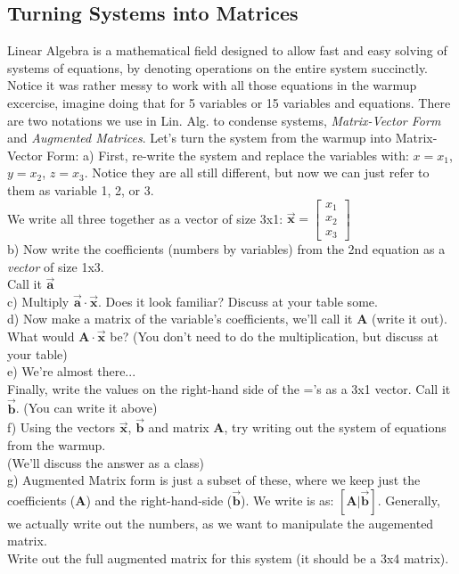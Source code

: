 \documentclass{article}
\begin{document}
\begin{flushleft}
\section{Turning Systems into Matrices}
Linear Algebra is a mathematical field designed to allow fast and easy solving of systems of equations, by denoting operations on the entire system succinctly. Notice it was rather messy to work with all those equations in the warmup excercise, imagine doing that for 5 variables or 15 variables and equations. There are two notations we use in Lin. Alg. to condense systems, \textit{Matrix-Vector Form} and \textit{Augmented Matrices}. Let's turn the system from the warmup into Matrix-Vector Form:
a) First, re-write the system and replace the variables with: $x = x_1$, $y=x_2$, $z=x_3$. Notice they are all still different, but now we can just refer to them as variable 1, 2, or 3. \\
We write all three together as a vector of size 3x1: $\vec{\textbf{x}}=\begin{bmatrix} x_1\\x_2\\x_3\end{bmatrix}$\\
\vspace{0.75in}
b) Now write the coefficients (numbers by variables) from the 2nd equation as a \textit{vector} of size 1x3. \\
Call it $\vec{\textbf{a}}$\\
\vspace{0.5in}
c) Multiply $\vec{\textbf{a}}\cdot\vec{\textbf{x}}$. Does it look familiar? Discuss at your table some. \\
\vspace{1in}
d) Now make a matrix of the variable's coefficients, we'll call it \textbf{A} (write it out). What would $\textbf{A}\cdot\vec{\textbf{x}}$ be? (You don't need to do the multiplication, but discuss at your table)\\
\vspace{1in}
e) We're almost there...\\
Finally, write the values on the right-hand side of the ='s as a 3x1 vector. Call it $\vec{\textbf{b}}$. (You can write it above)\\
f) Using the vectors $\vec{\textbf{x}}$, $\vec{\textbf{b}}$ and matrix \textbf{A}, try writing out the system of equations from the warmup.\\ (We'll discuss the answer as a class)\\
\vspace{0.5in}
g) Augmented Matrix form is just a subset of these, where we keep just the coefficients (\textbf{A}) and the right-hand-side ($\vec{\textbf{b}}$). We write is as: $[\textbf{A}|\vec{\textbf{b}}]$. Generally, we actually write out the numbers, as we want to manipulate the augemented matrix. \\
Write out the full augmented matrix for this system (it should be a 3x4 matrix). \\


\end{flushleft}
\end{document}
